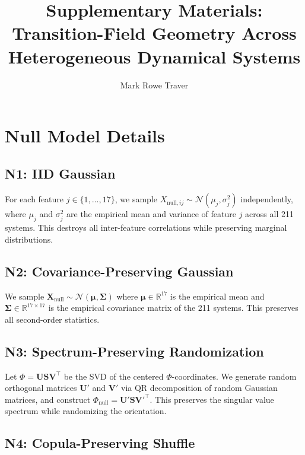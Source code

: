 \documentclass[10pt]{article}
\title{Supplementary Materials: Transition-Field Geometry Across Heterogeneous Dynamical Systems}
\author{Mark Rowe Traver}
\date{}
\begin{document}
\maketitle

\section{Null Model Details}
\label{sec:null_details}

\subsection{N1: IID Gaussian}

For each feature $j \in \{1, \dots, 17\}$, we sample $X_{\text{null},ij} \sim \mathcal{N}(\mu_j, \sigma_j^2)$ independently, where $\mu_j$ and $\sigma_j^2$ are the empirical mean and variance of feature $j$ across all 211 systems. This destroys all inter-feature correlations while preserving marginal distributions.

\subsection{N2: Covariance-Preserving Gaussian}

We sample $\mathbf{X}_{\text{null}} \sim \mathcal{N}(\boldsymbol{\mu}, \boldsymbol{\Sigma})$ where $\boldsymbol{\mu} \in \mathbb{R}^{17}$ is the empirical mean and $\boldsymbol{\Sigma} \in \mathbb{R}^{17 \times 17}$ is the empirical covariance matrix of the 211 systems. This preserves all second-order statistics.

\subsection{N3: Spectrum-Preserving Randomization}

Let $\Phi = \mathbf{U} \mathbf{S} \mathbf{V}^\top$ be the SVD of the centered $\Phi$-coordinates. We generate random orthogonal matrices $\mathbf{U}'$ and $\mathbf{V}'$ via QR decomposition of random Gaussian matrices, and construct $\Phi_{\text{null}} = \mathbf{U}' \mathbf{S} \mathbf{V}'^\top$. This preserves the singular value spectrum while randomizing the orientation.

\subsection{N4: Copula-Preserving Shuffle}
\end{document}
